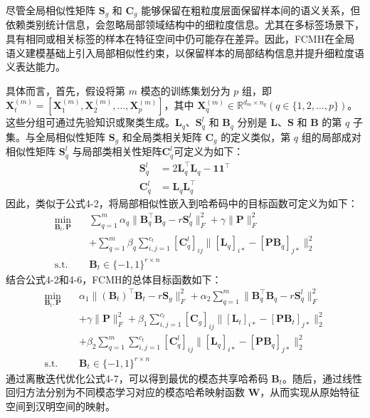 尽管全局相似性矩阵 $\mathbf{S}_g$ 和 $\mathbf{C}_g$ 能够保留在粗粒度层面保留样本间的语义关系，但依赖类别统计信息，会忽略局部领域结构中的细粒度信息。尤其在多标签场景下，具有相同或相关标签的样本在特征空间中仍可能存在差异。因此，FCMH在全局语义建模基础上引入局部相似性约束，以保留样本的局部结构信息并提升细粒度语义表达能力。

具体而言，首先，假设将第 $m$ 模态的训练集划分为 $p$ 组，即 $\mathbf{X}_t^{(m)} = [\mathbf{X}_1^{(m)}, \mathbf{X}_2^{(m)}, \dots, \mathbf{X}_p^{(m)}]$，其中 $\mathbf{X}_q^{(m)} \in \mathbb{R}^{d_m \times n_q} (q \in \{1,2,\dots,p\})$。这些分组可通过先验知识或聚类生成。$\mathbf{L}_q$、$\mathbf{S}_q^l$ 和 $\mathbf{B}_q$ 分别是 $\mathbf{L}$、$\mathbf{S}$ 和 $\mathbf{B}$ 的第 $q$ 子集。与全局相似性矩阵 $\mathbf{S}_g$ 和全局类相关矩阵 $\mathbf{C}_g$ 的定义类似，第 $q$ 组的局部成对相似性矩阵 $\mathbf{S}_q^l$ 与局部类相关性矩阵$\mathbf{C}_q^l$可定义为如下：
\begin{align}
  \mathbf{S}_q^l &= 2\mathbf{L}_q^{\top}\mathbf{L}_q - \mathbf{1}\mathbf{1}^{\top}
  \label{eq:mih-local-sim} \\
  \mathbf{C}_q^l &= \mathbf{L}_q\mathbf{L}_q^{\top}
  \label{eq:mih-local-corr}
\end{align}
因此，类似于公式4-2，将局部相似性嵌入到哈希码中的目标函数可定义为如下：
\begin{equation}
  \begin{aligned}
    \min_{\mathbf{B}_t,\mathbf{P}} \quad
    & \sum_{q=1}^{m} \alpha_q \|\mathbf{B}_q^{\top} \mathbf{B}_q - r \mathbf{S}_q^l\|_F^2 + \gamma \|\mathbf{P}\|_F^2 \\
    & + \sum_{q=1}^{m} \beta_q \sum_{i,j=1}^{c_t} [\mathbf{C}_q^l]_{ij}
    \|[\mathbf{L}_q]_{i*} - [\mathbf{P}\mathbf{B}_q]_{j*}\|_2^2 \\
    \text{s.t.} \quad
    & \mathbf{B}_t \in \{-1,1\}^{r \times n}
  \end{aligned}
\end{equation}
结合公式4-2和4-6，FCMH的总体目标函数如下：
\begin{equation}
  \begin{aligned}
    \min_{\mathbf{B}_t,\mathbf{P}} \quad
    & \alpha_1 \|(\mathbf{B}_t)^{\top} \mathbf{B}_t - r \mathbf{S}_g\|_F^2
    + \alpha_2 \sum_{q=1}^{m} \|\mathbf{B}_q^{\top} \mathbf{B}_q - r \mathbf{S}_q^l\|_F^2 \\
    & + \gamma \|\mathbf{P}\|_F^2
    + \beta_1 \sum_{i,j=1}^{c_t} [\mathbf{C}_g]_{ij}
    \|[\mathbf{L}_t]_{i*} - [\mathbf{P}\mathbf{B}_t]_{j*}\|_2^2 \\
    & + \beta_2 \sum_{q=1}^{m} \sum_{i,j=1}^{c_t} [\mathbf{C}_q^l]_{ij}
    \|[\mathbf{L}_q]_{i*} - [\mathbf{P}\mathbf{B}_q]_{j*}\|_2^2 \\
    \text{s.t.} \quad
    & \mathbf{B}_t \in \{-1,1\}^{r \times n}
  \end{aligned}
  \label{eq:mih-fcmh}
\end{equation}
通过离散迭代优化公式4-7，可以得到最优的模态共享哈希码 $\mathbf{B}_t$。随后，通过线性回归方法分别为不同模态学习对应的模态哈希映射函数 $\mathbf{W}$，从而实现从原始特征空间到汉明空间的映射。

